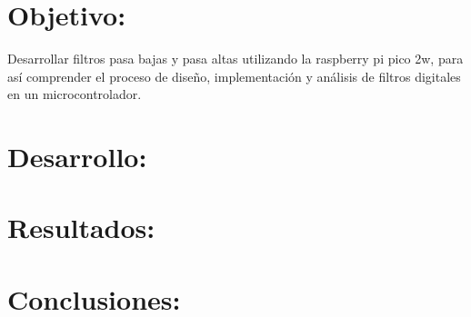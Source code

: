 \documentclass[letterpaper,12pt]{article}
\begin{document}
    

    \newpage
    \setcounter{page}{1}

    \section{Objetivo:}
    Desarrollar filtros pasa bajas y pasa altas utilizando la raspberry pi pico 2w, para así comprender el proceso de diseño, implementación y análisis de filtros digitales en un microcontrolador.
    
    
    \section{Desarrollo:}
    

    \newpage
    \section{Resultados:}
    

    \newpage
    \section{Conclusiones:}
\end{document}
